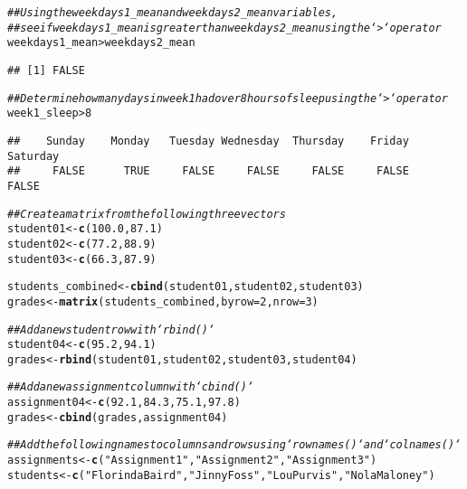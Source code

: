 \documentclass{article}\usepackage[]{graphicx}\usepackage[]{xcolor}
\makeatletter
\newcommand{\hlnum}[1]{\textcolor[rgb]{0.686,0.059,0.569}{#1}}%
\newcommand{\hlstr}[1]{\textcolor[rgb]{0.192,0.494,0.8}{#1}}%
\newcommand{\hlcom}[1]{\textcolor[rgb]{0.678,0.584,0.686}{\textit{#1}}}%
\newcommand{\hlopt}[1]{\textcolor[rgb]{0,0,0}{#1}}%
\newcommand{\hlstd}[1]{\textcolor[rgb]{0.345,0.345,0.345}{#1}}%
\newcommand{\hlkwb}[1]{\textcolor[rgb]{0.69,0.353,0.396}{#1}}%
\newcommand{\hlkwc}[1]{\textcolor[rgb]{0.333,0.667,0.333}{#1}}%
\newcommand{\hlkwd}[1]{\textcolor[rgb]{0.737,0.353,0.396}{\textbf{#1}}}%
\newenvironment{kframe}{%
 \def\at@end@of@kframe{}%
 \ifinner\ifhmode%
  \def\at@end@of@kframe{\end{minipage}}%
  \begin{minipage}{\columnwidth}%
 \fi\fi%
 \def\FrameCommand##1{\hskip\@totalleftmargin \hskip-\fboxsep
 \colorbox{shadecolor}{##1}\hskip-\fboxsep
     \hskip-\linewidth \hskip-\@totalleftmargin \hskip\columnwidth}%
 \MakeFramed {\advance\hsize-\width
   \@totalleftmargin\z@ \linewidth\hsize
   \@setminipage}}%
 {\par\unskip\endMakeFramed%
 \at@end@of@kframe}
\newenvironment{knitrout}{}{} %
\makeatother
\begin{document}
\begin{knitrout}
\begin{kframe}
\begin{alltt}
\hlcom{## Using the weekdays1_mean and weekdays2_mean variables,}
\hlcom{## see if weekdays1_mean is greater than weekdays2_mean using the `>` operator}
\hlstd{weekdays1_mean} \hlopt{>} \hlstd{weekdays2_mean}
\end{alltt}
\begin{verbatim}
## [1] FALSE
\end{verbatim}
\begin{alltt}
\hlcom{## Determine how many days in week 1 had over 8 hours of sleep using the `>` operator}
\hlstd{week1_sleep}\hlopt{>}\hlnum{8}
\end{alltt}
\begin{verbatim}
##    Sunday    Monday   Tuesday Wednesday  Thursday    Friday  Saturday 
##     FALSE      TRUE     FALSE     FALSE     FALSE     FALSE     FALSE
\end{verbatim}
\begin{alltt}
\hlcom{## Create a matrix from the following three vectors}
\hlstd{student01} \hlkwb{<-} \hlkwd{c}\hlstd{(}\hlnum{100.0}\hlstd{,} \hlnum{87.1}\hlstd{)}
\hlstd{student02} \hlkwb{<-} \hlkwd{c}\hlstd{(}\hlnum{77.2}\hlstd{,} \hlnum{88.9}\hlstd{)}
\hlstd{student03} \hlkwb{<-} \hlkwd{c}\hlstd{(}\hlnum{66.3}\hlstd{,} \hlnum{87.9}\hlstd{)}

\hlstd{students_combined} \hlkwb{<-} \hlkwd{cbind}\hlstd{(student01, student02, student03)}
\hlstd{grades} \hlkwb{<-} \hlkwd{matrix}\hlstd{(students_combined,} \hlkwc{byrow} \hlstd{=} \hlnum{2}\hlstd{,} \hlkwc{nrow} \hlstd{=} \hlnum{3}\hlstd{)}

\hlcom{## Add a new student row with `rbind()`}
\hlstd{student04} \hlkwb{<-} \hlkwd{c}\hlstd{(}\hlnum{95.2}\hlstd{,} \hlnum{94.1}\hlstd{)}
\hlstd{grades} \hlkwb{<-} \hlkwd{rbind}\hlstd{(student01, student02, student03, student04)}

\hlcom{## Add a new assignment column with `cbind()`}
\hlstd{assignment04} \hlkwb{<-} \hlkwd{c}\hlstd{(}\hlnum{92.1}\hlstd{,} \hlnum{84.3}\hlstd{,} \hlnum{75.1}\hlstd{,} \hlnum{97.8}\hlstd{)}
\hlstd{grades} \hlkwb{<-} \hlkwd{cbind}\hlstd{(grades, assignment04)}

\hlcom{## Add the following names to columns and rows using `rownames()` and `colnames()`}
\hlstd{assignments} \hlkwb{<-} \hlkwd{c}\hlstd{(}\hlstr{"Assignment 1"}\hlstd{,} \hlstr{"Assignment 2"}\hlstd{,} \hlstr{"Assignment 3"}\hlstd{)}
\hlstd{students} \hlkwb{<-} \hlkwd{c}\hlstd{(}\hlstr{"Florinda Baird"}\hlstd{,} \hlstr{"Jinny Foss"}\hlstd{,} \hlstr{"Lou Purvis"}\hlstd{,} \hlstr{"Nola Maloney"}\hlstd{)}


\end{alltt}
\end{kframe}
\end{knitrout}
\end{document}

